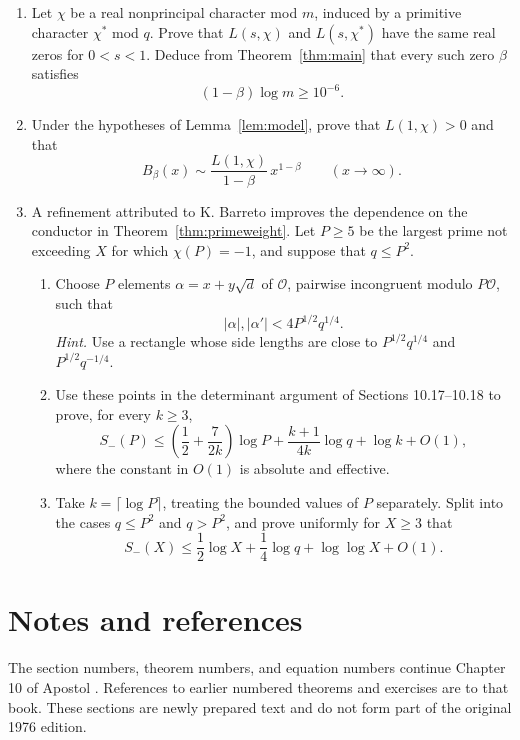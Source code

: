 \documentclass[11pt,twoside,leqno]{article}
\theoremstyle{apostol}
\newcommand{\cO}{\mathcal O}
\begin{document}
\small
\begin{enumerate}[start=21,itemsep=7pt,topsep=3pt]
\item Let \(\chi\) be a real nonprincipal character mod \(m\), induced by
a primitive character \(\chi^*\) mod \(q\). Prove that \(L(s,\chi)\) and
\(L(s,\chi^*)\) have the same real zeros for \(0<s<1\). Deduce from
Theorem~\ref{thm:main} that every such zero \(\beta\) satisfies
\[
 (1-\beta)\log m\ge10^{-6}.
\]

\item Under the hypotheses of Lemma~\ref{lem:model}, prove that
\(L(1,\chi)>0\) and that
\[
 B_\beta(x)\sim
 \frac{L(1,\chi)}{1-\beta}\,x^{1-\beta}
 \qquad(x\to\infty).
\]

\item A refinement attributed to K. Barreto improves the dependence on
the conductor in Theorem~\ref{thm:primeweight}. Let \(P\ge5\) be the
largest prime not exceeding \(X\) for which \(\chi(P)=-1\), and suppose
that \(q\le P^2\).
\begin{enumerate}[label=(\alph*),leftmargin=1.8em,itemsep=2pt,topsep=2pt]
\item Choose \(P\) elements \(\alpha=x+y\sqrt d\) of \(\cO\), pairwise
incongruent modulo \(P\cO\), such that
\[
 |\alpha|,|\alpha'|<4P^{1/2}q^{1/4}.
\]
\textit{Hint.} Use a rectangle whose side lengths are close to
\(P^{1/2}q^{1/4}\) and \(P^{1/2}q^{-1/4}\).
\item Use these points in the determinant argument of Sections 10.17--10.18
to prove, for every \(k\ge3\),
\[
 S_-(P)\le\left(\frac12+\frac7{2k}\right)\log P
 +\frac{k+1}{4k}\log q+\log k+O(1),
\]
where the constant in \(O(1)\) is absolute and effective.
\item Take \(k=\lceil\log P\rceil\), treating the bounded values of \(P\)
separately. Split into the cases \(q\le P^2\) and \(q>P^2\), and prove
uniformly for \(X\ge3\) that
\[
 S_-(X)\le\frac12\log X+\frac14\log q+\log\log X+O(1).
\]
\end{enumerate}
\end{enumerate}
\normalsize

\clearpage
{}
\section*{Notes and references}

The section numbers, theorem numbers, and equation numbers continue
Chapter 10 of Apostol \cite{apostol}. References to earlier numbered
theorems and exercises are to that book. These sections are newly prepared
text and do not form part of the original 1976 edition.
\end{document}

